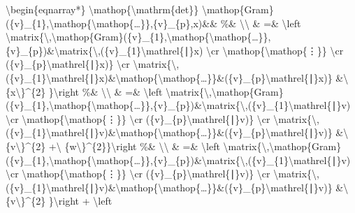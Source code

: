\documentclass[]{article}
\begin{document}
\textbackslash{}begin\{eqnarray*\}
\textbackslash{}mathop\{\textbackslash{}mathrm\{det\}\}
\textbackslash{}mathop\{Gram\}(\{v\}\_\{1\},\textbackslash{}mathop\{\textbackslash{}mathop\{\ldots{}\}\},\{v\}\_\{p\},x)\&\&
\%\& \textbackslash{}\textbackslash{} \& =\& \textbackslash{}left
\textbar{}\textbackslash{}matrix\{\textbackslash{},\textbackslash{}mathop\{Gram\}(\{v\}\_\{1\},\textbackslash{}mathop\{\textbackslash{}mathop\{\ldots{}\}\},\{v\}\_\{p\})\&\textbackslash{}matrix\{\textbackslash{},(\{v\}\_\{1\}\textbackslash{}mathrel\{∣\}x)
\textbackslash{}cr \textbackslash{}mathop\{\textbackslash{}mathop\{⋮\}\}
\textbackslash{}cr (\{v\}\_\{p\}\textbackslash{}mathrel\{∣\}x)\}
\textbackslash{}cr
\textbackslash{}matrix\{\textbackslash{},(\{v\}\_\{1\}\textbackslash{}mathrel\{∣\}x)\&\textbackslash{}mathop\{\textbackslash{}mathop\{\ldots{}\}\}\&(\{v\}\_\{p\}\textbackslash{}mathrel\{∣\}x)\}
\&\textbackslash{}\textbar{}\{x\textbackslash{}\textbar{}\}\^{}\{2\}
\}\textbackslash{}right \textbar{} \%\& \textbackslash{}\textbackslash{}
\& =\& \textbackslash{}left
\textbar{}\textbackslash{}matrix\{\textbackslash{},\textbackslash{}mathop\{Gram\}(\{v\}\_\{1\},\textbackslash{}mathop\{\textbackslash{}mathop\{\ldots{}\}\},\{v\}\_\{p\})\&\textbackslash{}matrix\{\textbackslash{},(\{v\}\_\{1\}\textbackslash{}mathrel\{∣\}v)
\textbackslash{}cr \textbackslash{}mathop\{\textbackslash{}mathop\{⋮\}\}
\textbackslash{}cr (\{v\}\_\{p\}\textbackslash{}mathrel\{∣\}v)\}
\textbackslash{}cr
\textbackslash{}matrix\{\textbackslash{},(\{v\}\_\{1\}\textbackslash{}mathrel\{∣\}v)\&\textbackslash{}mathop\{\textbackslash{}mathop\{\ldots{}\}\}\&(\{v\}\_\{p\}\textbackslash{}mathrel\{∣\}v)\}
\&\textbackslash{}\textbar{}\{v\textbackslash{}\textbar{}\}\^{}\{2\}
+\textbackslash{}\textbar{}
\{w\textbackslash{}\textbar{}\}\^{}\{2\}\}\textbackslash{}right
\textbar{} \%\& \textbackslash{}\textbackslash{} \& =\&
\textbackslash{}left
\textbar{}\textbackslash{}matrix\{\textbackslash{},\textbackslash{}mathop\{Gram\}(\{v\}\_\{1\},\textbackslash{}mathop\{\textbackslash{}mathop\{\ldots{}\}\},\{v\}\_\{p\})\&\textbackslash{}matrix\{\textbackslash{},(\{v\}\_\{1\}\textbackslash{}mathrel\{∣\}v)
\textbackslash{}cr \textbackslash{}mathop\{\textbackslash{}mathop\{⋮\}\}
\textbackslash{}cr (\{v\}\_\{p\}\textbackslash{}mathrel\{∣\}v)\}
\textbackslash{}cr
\textbackslash{}matrix\{\textbackslash{},(\{v\}\_\{1\}\textbackslash{}mathrel\{∣\}v)\&\textbackslash{}mathop\{\textbackslash{}mathop\{\ldots{}\}\}\&(\{v\}\_\{p\}\textbackslash{}mathrel\{∣\}v)\}
\&\textbackslash{}\textbar{}\{v\textbackslash{}\textbar{}\}\^{}\{2\}
\}\textbackslash{}right \textbar{} + \textbackslash{}left
\end{document}

